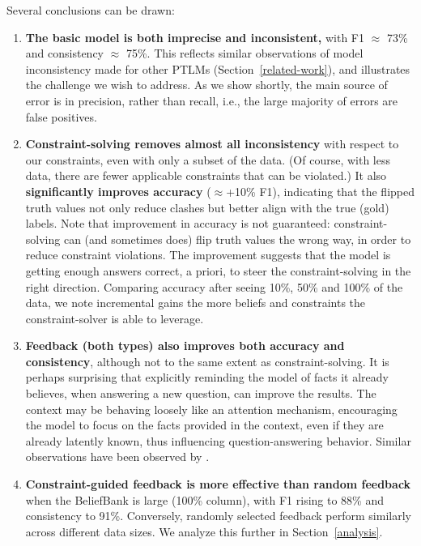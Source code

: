 \documentclass[11pt]{article}
\newcommand{\eat}[1]{}
\begin{document}
\noindent
Several conclusions can be drawn: %
\begin{enumerate}
\item {\bf The basic model is both imprecise and inconsistent,} with F1 $\approx$ 73\% and consistency $\approx$ 75\%.
This reflects similar observations of model inconsistency made for other PTLMs (Section~\ref{related-work}), and illustrates the
challenge we wish to address. As we show shortly, the main source of error is in precision, rather than recall,
i.e., the large majority of errors are false positives.

\item {\bf Constraint-solving removes almost all inconsistency} with respect to our constraints, even with
only a subset of the data. (Of course, with less data, there are fewer applicable constraints that can be
violated.) It also {\bf significantly improves accuracy} ($\approx$+10\% F1), indicating
that the flipped truth values not only reduce clashes but better align with the true (gold) labels. Note
that improvement in accuracy is not guaranteed: constraint-solving can (and sometimes does) flip
truth values the wrong way, in order to reduce constraint violations. The improvement suggests 
that the model is getting enough answers correct, a priori, to steer the constraint-solving in
the right direction. Comparing accuracy after seeing 10\%, 50\% and 100\% of the data, we note incremental gains the more beliefs and constraints the constraint-solver is able to leverage.   

\item {\bf Feedback (both types) also improves both accuracy and consistency}, although not
to the same extent as constraint-solving. It is perhaps surprising that explicitly reminding the model
of facts it already believes, when answering a new question, can improve the results.
The context may be behaving loosely like an attention mechanism, encouraging the
model to focus on the facts provided in the context, even if they are already latently known,
thus influencing question-answering behavior. Similar observations have been observed by \citet{selftalk}. 

\item {\bf Constraint-guided feedback is more effective than random feedback} when the BeliefBank is
large (100\% column), with F1 rising to 88\% and consistency to 91\%. 
Conversely, %
randomly selected feedback perform similarly across different data sizes. We analyze this further in Section~\ref{analysis}.


\end{enumerate}
\end{document}
